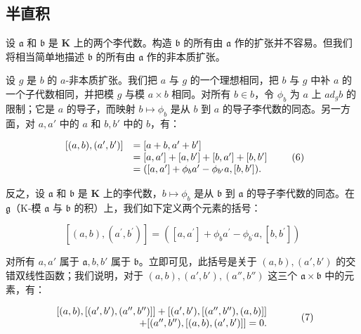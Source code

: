 \subsection{半直积}

设 \(\mathfrak{a}\) 和 \(\mathfrak{b}\) 是 \(\mathbf{K}\) 上的两个李代数。构造 \(\mathfrak{b}\) 的所有由 \(\mathfrak{a}\) 作的扩张并不容易。但我们将相当简单地描述 \(\mathfrak{b}\) 的所有由 \(\mathfrak{a}\) 作的非本质扩张。

设 \(g\) 是 \(b\) 的 \(a\)-非本质扩张。我们把 \(a\) 与 \(g\) 的一个理想相同，把 \(b\) 与 \(g\) 中补 \(a\) 的一个子代数相同，并把模 \(g\) 与模 \(a \times b\) 相同。对所有 \(b \in b\)，令 \(\phi_b\) 为 \(a\) 上 \(ad_g b\) 的限制；它是 \(a\) 的导子，而映射 \(b \mapsto \phi_b\) 是从 \(b\) 到 \(a\) 的导子李代数的同态。另一方面，对 \(a, a'\) 中的 \(a\) 和 \(b, b'\) 中的 \(b\)，有：

\[
\begin{array}{r l} {[ (a, b), (a ^ {\prime}, b ^ {\prime}) ]} & {= [ a + b, a ^ {\prime} + b ^ {\prime} ]} \\ & {= [ a, a ^ {\prime} ] + [ a, b ^ {\prime} ] + [ b, a ^ {\prime} ] + [ b, b ^ {\prime} ]} \\ & {= ([ a, a ^ {\prime} ] + \phi_ {b} a ^ {\prime} - \phi_ {b ^ {\prime}} a, [ b, b ^ {\prime} ]).} \end{array}\tag{6}
\]

反之，设 \(\mathfrak{a}\) 和 \(\mathfrak{b}\) 是 \(\mathbf{K}\) 上的李代数，\(b \mapsto \phi_b\) 是从 \(\mathfrak{b}\) 到 \(\mathfrak{a}\) 的导子李代数的同态。在 \(\mathfrak{g}\)（K-模 \(\mathfrak{a}\) 与 \(\mathfrak{b}\) 的积）上，我们如下定义两个元素的括号：

\[
[ (a, b), (a ^ {\prime}, b ^ {\prime}) ] = ([ a, a ^ {\prime} ] + \phi_ {b} a ^ {\prime} - \phi_ {b ^ {\prime}} a, [ b, b ^ {\prime} ])
\]

对所有 \(a, a'\) 属于 \(\mathfrak{a}, b, b'\) 属于 \(\mathfrak{b}\)。立即可见，此括号是关于 \((a, b), (a', b')\) 的交错双线性函数；我们说明，对于 \((a, b), (a', b'), (a'', b'')\) 这三个 \(\mathfrak{a} \times \mathfrak{b}\) 中的元素，有：

\[
\begin{array}{r l} {[ (a, b), [ (a ^ {\prime}, b ^ {\prime}), (a ^ {\prime \prime}, b ^ {\prime \prime}) ] ] + [ (a ^ {\prime}, b ^ {\prime}), [ (a ^ {\prime \prime}, b ^ {\prime \prime}), (a, b) ] ]} & \\ {+ [ (a ^ {\prime \prime}, b ^ {\prime \prime}), [ (a, b), (a ^ {\prime}, b ^ {\prime}) ] ] = 0.} \end{array}\tag{7}
\]

